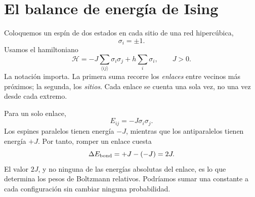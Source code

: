 \section{El balance de energía de Ising}

Coloquemos un espín de dos estados en cada sitio de una red hipercúbica,
\begin{equation}
\sigma_i=\pm1.
\end{equation}
Usamos el hamiltoniano
\begin{equation}
\mathcal H
=-J\sum_{\langle ij\rangle}\sigma_i\sigma_j
+h\sum_i\sigma_i,
\qquad J>0.
\label{eq:ising-hamiltonian}
\end{equation}
La notación importa. La primera suma recorre los \emph{enlaces} entre vecinos más próximos; la segunda, los \emph{sitios}. Cada enlace se cuenta una sola vez, no una vez desde cada extremo.

Para un solo enlace,
\begin{equation}
E_{ij}=-J\sigma_i\sigma_j.
\end{equation}
Los espines paralelos tienen energía \(-J\), mientras que los antiparalelos tienen energía \(+J\). Por tanto, romper un enlace cuesta
\begin{equation}
\Delta E_{\rm bond}=+J-(-J)=2J.
\label{eq:broken-bond}
\end{equation}
El valor \(2J\), y no ninguna de las energías absolutas del enlace, es lo que determina los pesos de Boltzmann relativos. Podríamos sumar una constante a cada configuración sin cambiar ninguna probabilidad.

\begin{classroomqa}
\end{classroomqa}

\begin{classroomqa}
\end{classroomqa}

